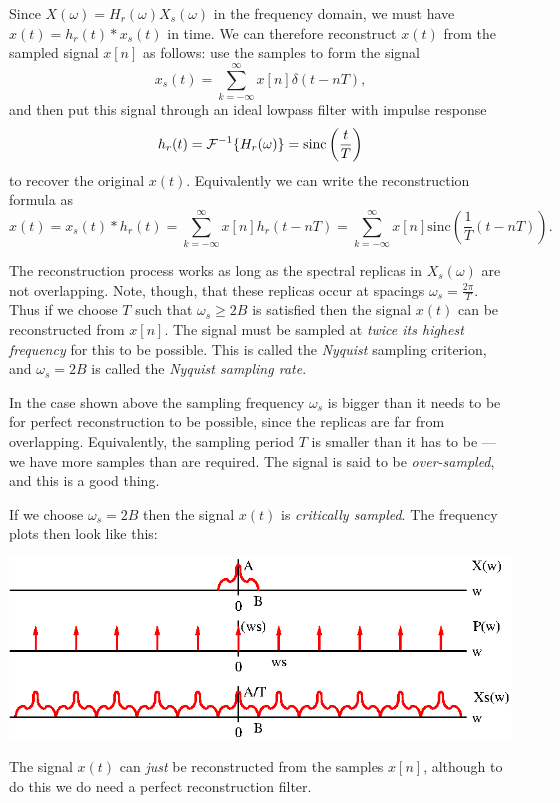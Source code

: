 \documentclass[10pt]{beamer}
\newcommand{\conv}{\ast}
\begin{document}
Since $X(\omega) = H_r(\omega) X_s(\omega)$ in the frequency domain, we must have $x(t) = h_r(t) \conv x_s(t)$ in time.  We can therefore reconstruct $x(t)$ from the sampled signal $x[n]$ as follows:  use the samples to form the signal
\begin{equation*}
  x_s(t) = \sum_{k=-\infty}^{\infty} x[n] \delta(t - n T),
\end{equation*}
and then put this signal through an ideal lowpass filter with impulse response
\begin{equation*}
  h_r(t) = {\cal F}^{-1} \{H_r(\omega)\} = \text{sinc} \left(\frac{t}{T}\right)
\end{equation*}
to recover the original $x(t)$.  Equivalently we can write the reconstruction formula as
\begin{equation*}
  x(t) = x_s(t) \conv h_r(t) = \sum_{k=-\infty}^{\infty} x[n] h_r(t - n T) = \sum_{k=-\infty}^{\infty} x[n] \text{sinc}\left(\frac{1}{T} (t - n T) \right).
\end{equation*}

The reconstruction process works as long as the spectral replicas in $X_s(\omega)$ are not overlapping.  Note, though, that these replicas occur at spacings $\omega_s = \frac{2\pi}{T}$.  Thus if we choose $T$ such that $\omega_s \geq 2B$ is satisfied then the signal $x(t)$ can be reconstructed from $x[n]$.  The signal must be sampled at {\em twice its highest frequency} for this to be possible.  This is called the {\em Nyquist} sampling criterion, and $\omega_s = 2B$ is called the {\em Nyquist sampling rate}.

In the case shown above the sampling frequency $\omega_s$ is bigger than it needs to be for perfect reconstruction to be possible, since the replicas are far from overlapping.  Equivalently, the sampling period $T$ is smaller than it has to be --- we have more samples than are required.    The signal is said to be {\em over-sampled}, and this is a good thing.

If we choose $\omega_s = 2B$ then the signal $x(t)$ is {\em critically sampled}.  The frequency plots then look like this:
\begin{center}
  \includegraphics{sampxfreq2}
\end{center}
The signal $x(t)$ can {\em just} be reconstructed from the samples $x[n]$, although to do this we do need a perfect reconstruction filter.
\end{document}
